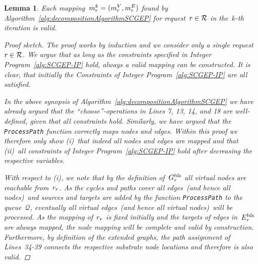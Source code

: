 \documentclass[10pt, conference, letterpaper]{IEEEtran}
\newtheorem{lemma}[theorem]{Lemma}
\begin{document}
\begin{lemma}
\label{lem:validity-of-kth-decomposition-scgep}
Each mapping~$\mapping=(\mapV,\mapE)$ found by Algorithm~\ref{alg:decompositionAlgorithmSCGEP} for request~$r \in \mathcal{R}$ in the~$k$-th iteration is \emph{valid}.
\begin{proof}[Proof sketch]
The proof works by induction and we consider only a single request $r \in \mathcal{R}$. We argue that as long as the constraints specified in Integer Program~\ref{alg:SCGEP-IP} hold, always a valid mapping can be constructed. It is clear, that initially the Constraints  of Integer Program~\ref{alg:SCGEP-IP} are all satisfied.  

In the above synopsis of Algorithm~\ref{alg:decompositionAlgorithmSCGEP} we have already argued that the ``choose''-operations in Lines 7, 13, 14, and 18 are well-defined, given that all constraints hold. Similarly, we have argued that the \texttt{ProcessPath} function correctly maps nodes and edges. Within this proof we therefore only show (i)~that indeed all nodes and edges are mapped and that (ii)~all constraints of Integer Program~\ref{alg:SCGEP-IP} hold after decreasing the respective variables.

With respect to (i), we note that by the definition of~$G^{\textnormal{bfs}}_{r}$ all virtual nodes are reachable from~$\VVroot$. As the cycles and paths cover all edges~(and hence all nodes)~and sources and targets are added by the function \texttt{ProcessPath} to the queue~$\mathcal{Q}$, eventually all virtual edges~(and hence all virtual nodes)~will be processed. As the mapping of~$\VVroot$ is fixed initially and the targets of edges in~$E^{\textnormal{bfs}}_{r}$ are always mapped, the node mapping will be complete and valid by construction. Furthermore, by definition of the extended graphs, the path assignment of Lines~34-39 connects the respective substrate node locations and therefore is also valid.


\end{proof}
\end{lemma}
\end{document}
